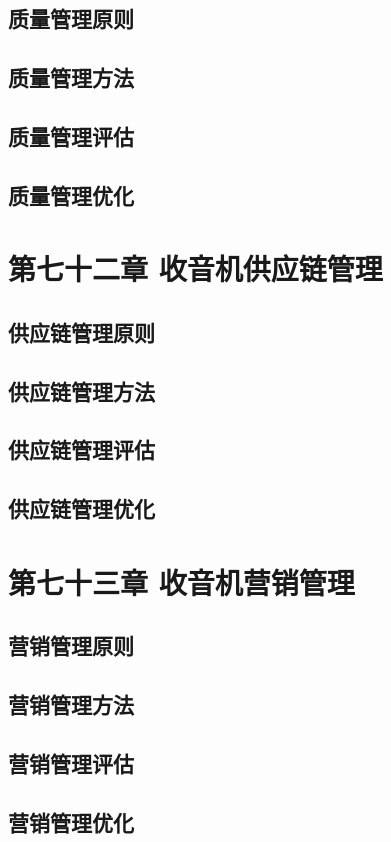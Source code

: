 \documentclass[12pt,UTF8]{ctexbook}
\begin{document}
\section{质量管理原则}
\section{质量管理方法}
\section{质量管理评估}
\section{质量管理优化}

\chapter{第七十二章 收音机供应链管理}

\section{供应链管理原则}
\section{供应链管理方法}
\section{供应链管理评估}
\section{供应链管理优化}

\chapter{第七十三章 收音机营销管理}

\section{营销管理原则}
\section{营销管理方法}
\section{营销管理评估}
\section{营销管理优化}
\end{document}

